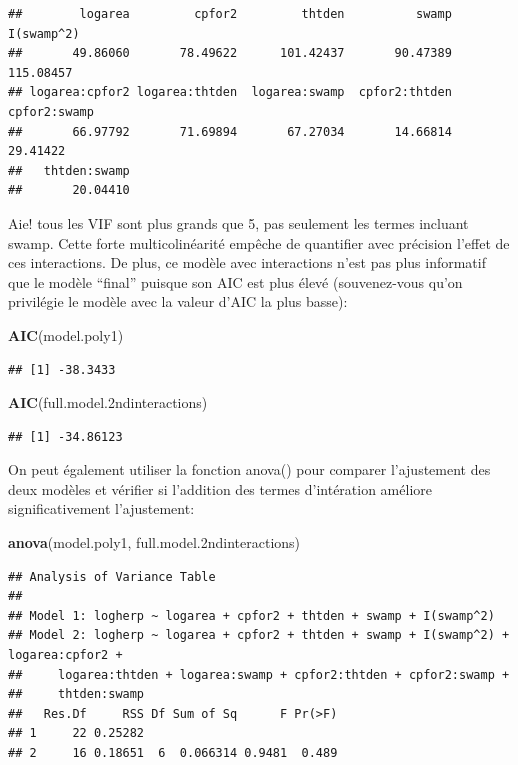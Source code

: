 \documentclass[
  12pt,
]{book}
\newenvironment{Shaded}{\begin{snugshade}}{\end{snugshade}}
\newcommand{\FloatTok}[1]{\textcolor[rgb]{0.00,0.00,0.81}{#1}}
\newcommand{\KeywordTok}[1]{\textcolor[rgb]{0.13,0.29,0.53}{\textbf{#1}}}
\newcommand{\NormalTok}[1]{#1}
\begin{document}
\begin{verbatim}
##        logarea         cpfor2         thtden          swamp     I(swamp^2) 
##       49.86060       78.49622      101.42437       90.47389      115.08457 
## logarea:cpfor2 logarea:thtden  logarea:swamp  cpfor2:thtden   cpfor2:swamp 
##       66.97792       71.69894       67.27034       14.66814       29.41422 
##   thtden:swamp 
##       20.04410
\end{verbatim}

Aie! tous les VIF sont plus grands que 5, pas seulement les termes incluant swamp. Cette forte multicolinéarité empêche de quantifier avec précision l'effet de ces interactions. De plus, ce modèle avec interactions n'est pas plus informatif que le modèle ``final'' puisque son AIC est plus élevé (souvenez-vous qu'on privilégie le modèle avec la valeur d'AIC la plus basse):

\begin{Shaded}
\begin{Highlighting}[]
\KeywordTok{AIC}\NormalTok{(model.poly1)}
\end{Highlighting}
\end{Shaded}

\begin{verbatim}
## [1] -38.3433
\end{verbatim}

\begin{Shaded}
\begin{Highlighting}[]
\KeywordTok{AIC}\NormalTok{(full.model}\FloatTok{.2}\NormalTok{ndinteractions)}
\end{Highlighting}
\end{Shaded}

\begin{verbatim}
## [1] -34.86123
\end{verbatim}

On peut également utiliser la fonction anova() pour comparer l'ajustement des deux modèles et vérifier si l'addition des termes d'intération améliore significativement l'ajustement:

\begin{Shaded}
\begin{Highlighting}[]
\KeywordTok{anova}\NormalTok{(model.poly1, full.model}\FloatTok{.2}\NormalTok{ndinteractions)}
\end{Highlighting}
\end{Shaded}

\begin{verbatim}
## Analysis of Variance Table
## 
## Model 1: logherp ~ logarea + cpfor2 + thtden + swamp + I(swamp^2)
## Model 2: logherp ~ logarea + cpfor2 + thtden + swamp + I(swamp^2) + logarea:cpfor2 + 
##     logarea:thtden + logarea:swamp + cpfor2:thtden + cpfor2:swamp + 
##     thtden:swamp
##   Res.Df     RSS Df Sum of Sq      F Pr(>F)
## 1     22 0.25282                           
## 2     16 0.18651  6  0.066314 0.9481  0.489
\end{verbatim}
\end{document}
